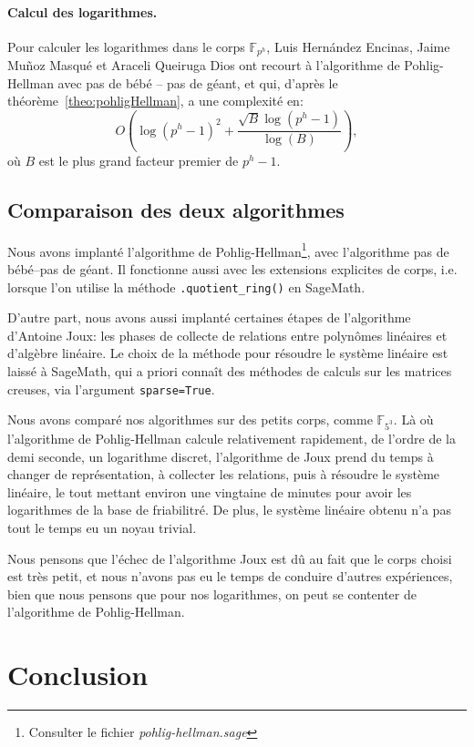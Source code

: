 \documentclass[a4paper, titlepage, 11pt]{article}
\theoremstyle{definition}
\theoremstyle{remark}
\def\O{O}
\def\gf #1{\mathbb{F}_{#1}}
\begin{document}
\paragraph{Calcul des logarithmes.}Pour calculer les logarithmes dans le corps $\gf{p^h}$, Luis Hern\'andez Encinas, Jaime Mu\~noz Masqué et Araceli Queiruga Dios ont recourt à l'algorithme de Pohlig-Hellman avec pas de bébé -- pas de géant, et qui, d'après le théorème~\ref{theo:pohligHellman}, a une complexité en:
$$\O\left(\log(p^h-1)^2 + \frac{\sqrt{B}\log(p^h-1)}{\log(B)}\right),$$
où $B$ est le plus grand facteur premier de $p^h-1$.

\subsection{Comparaison des deux algorithmes}

Nous avons implanté l'algorithme de Pohlig-Hellman\footnote{Consulter le fichier \textit{pohlig-hellman.sage}}, avec l'algorithme pas de bébé--pas de géant.
Il fonctionne aussi avec les extensions explicites de corps, i.e. lorsque l'on utilise la méthode \verb|.quotient_ring()| en SageMath.

D'autre part, nous avons aussi implanté certaines étapes de l'algorithme d'Antoine Joux: les phases de collecte de relations entre polynômes linéaires et d'algèbre linéaire.
Le choix de la méthode pour résoudre le système linéaire est laissé à SageMath, qui a priori connaît des méthodes de calculs sur les matrices creuses, via l'argument \verb|sparse=True|.

Nous avons comparé nos algorithmes sur des petits corps, comme $\gf{5^3}$. Là où l'algorithme de Pohlig-Hellman calcule relativement rapidement, de l'ordre de la demi seconde, un logarithme discret,
l'algorithme de Joux prend du temps à changer de représentation, à collecter les relations, puis à résoudre le système linéaire, le tout mettant environ une vingtaine de minutes pour avoir les logarithmes de la base de friabilitré. De plus, le système linéaire obtenu n'a pas tout le temps eu
un noyau trivial.

Nous pensons que l'échec de l'algorithme Joux est dû au fait que le corps choisi est très petit, et nous n'avons pas eu le temps de conduire d'autres expériences, bien que nous pensons que pour nos logarithmes, on peut se contenter de l'algorithme de Pohlig-Hellman.

\section*{Conclusion}
\end{document}
